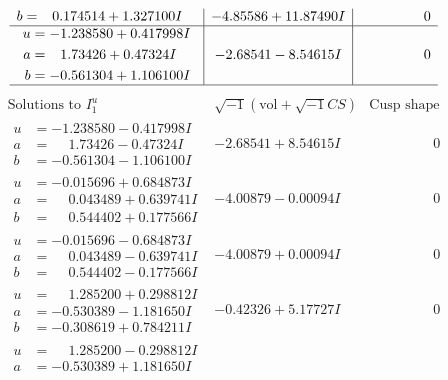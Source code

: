 \documentclass[1p]{elsarticle_modified}
\theoremstyle{definition}
\newcommand{\I}{\sqrt{-1}}
\begin{document}
$$\begin{array}{c|c|c}
\begin{aligned}
b &= \phantom{-}0.174514 + 1.327100 I\end{aligned}
 & -4.85586 + 11.87490 I & \phantom{-0.000000 } 0 \\ \hline\begin{aligned}
u &= -1.238580 + 0.417998 I \\
a &= \phantom{-}1.73426 + 0.47324 I \\
b &= -0.561304 + 1.106100 I\end{aligned}
 & -2.68541 - 8.54615 I & \phantom{-0.000000 } 0\\
 \hline 
 \end{array}$$\newpage$$\begin{array}{c|c|c}  
\text{Solutions to }I^u_{1}& \I (\text{vol} + \sqrt{-1}CS) & \text{Cusp shape}\\
 \hline 
\begin{aligned}
u &= -1.238580 - 0.417998 I \\
a &= \phantom{-}1.73426 - 0.47324 I \\
b &= -0.561304 - 1.106100 I\end{aligned}
 & -2.68541 + 8.54615 I & \phantom{-0.000000 } 0 \\ \hline\begin{aligned}
u &= -0.015696 + 0.684873 I \\
a &= \phantom{-}0.043489 + 0.639741 I \\
b &= \phantom{-}0.544402 + 0.177566 I\end{aligned}
 & -4.00879 - 0.00094 I & \phantom{-0.000000 } 0 \\ \hline\begin{aligned}
u &= -0.015696 - 0.684873 I \\
a &= \phantom{-}0.043489 - 0.639741 I \\
b &= \phantom{-}0.544402 - 0.177566 I\end{aligned}
 & -4.00879 + 0.00094 I & \phantom{-0.000000 } 0 \\ \hline\begin{aligned}
u &= \phantom{-}1.285200 + 0.298812 I \\
a &= -0.530389 - 1.181650 I \\
b &= -0.308619 + 0.784211 I\end{aligned}
 & -0.42326 + 5.17727 I & \phantom{-0.000000 } 0 \\ \hline\begin{aligned}
u &= \phantom{-}1.285200 - 0.298812 I \\
a &= -0.530389 + 1.181650 I \\

\end{aligned}
\end{array}$$
\end{document}
